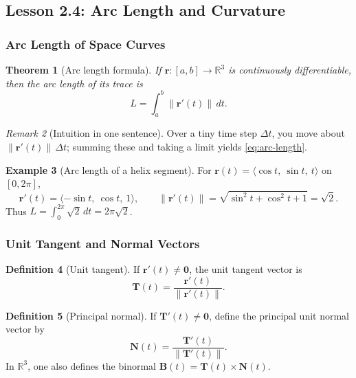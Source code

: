 \documentclass[12pt]{article}
\numberwithin{equation}{section}
\newcommand{\RR}{\mathbb{R}}
\newcommand{\vect}[1]{\boldsymbol{#1}}   %
\newcommand{\norm}[1]{\left\lVert #1\right\rVert}
\theoremstyle{plain}
\newtheorem{theorem}{Theorem}[section]
\theoremstyle{definition}
\newtheorem{definition}[theorem]{Definition}
\newtheorem{example}[theorem]{Example}
\theoremstyle{remark}
\newtheorem{remark}[theorem]{Remark}
\begin{document}
\subsection{Lesson 2.4: Arc Length and Curvature}

\subsubsection{Arc Length of Space Curves}

\begin{theorem}[Arc length formula]\label{thm:arc-length}
If $\vect r:[a,b]\to\RR^3$ is continuously differentiable, then the arc length of its trace is
\begin{equation}\label{eq:arc-length}
L=\int_a^b \norm{\vect r'(t)}\,dt.
\end{equation}
\end{theorem}

\begin{remark}[Intuition in one sentence]
Over a tiny time step $\Delta t$, you move about $\norm{\vect r'(t)}\,\Delta t$; summing these and taking a limit yields \cref{eq:arc-length}.
\end{remark}

\begin{example}[Arc length of a helix segment]
For $\vect r(t)=\langle \cos t,\ \sin t,\ t\rangle$ on $[0,2\pi]$,
\[
\vect r'(t)=\langle -\sin t,\ \cos t,\ 1\rangle,\qquad
\norm{\vect r'(t)}=\sqrt{\sin^2 t+\cos^2 t+1}=\sqrt{2}.
\]
Thus $L=\int_0^{2\pi}\sqrt{2}\,dt=2\pi\sqrt{2}$.
\end{example}

\subsubsection{Unit Tangent and Normal Vectors}

\begin{definition}[Unit tangent]\label{def:unit-tangent}
If $\vect r'(t)\neq\vect 0$, the unit tangent vector is
\begin{equation}\label{eq:unit-tangent}
\vect T(t)=\frac{\vect r'(t)}{\norm{\vect r'(t)}}.
\end{equation}
\end{definition}

\begin{definition}[Principal normal]
If $\vect T'(t)\neq\vect 0$, define the principal unit normal vector by
\[
\vect N(t)=\frac{\vect T'(t)}{\norm{\vect T'(t)}}.
\]
In $\RR^3$, one also defines the binormal $\vect B(t)=\vect T(t)\times \vect N(t)$.
\end{definition}
\end{document}
